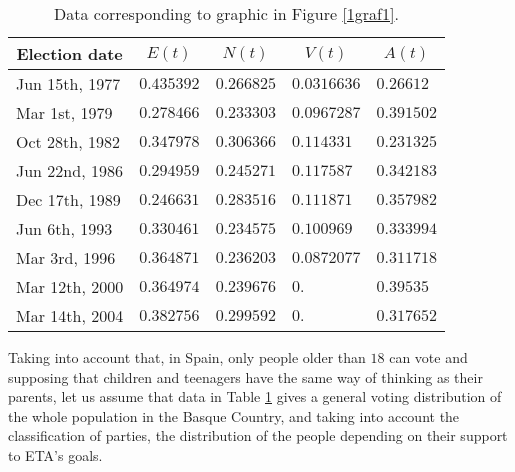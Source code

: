 \begin{table}[htb]
\label{1Table1}
\begin{center}
\begin{tabular}{ccccc}
\hline
Election date & $E(t)$ & $N(t)$ & $V(t)$ & $A(t)$ \\ \hline
\multicolumn{1}{l}{Jun 15th, 1977} & \multicolumn{1}{l}{$0.435392$} & 
\multicolumn{1}{l}{$0.266825$} & \multicolumn{1}{l}{$0.0316636$} & 
\multicolumn{1}{l}{$0.26612$} \\ 
\multicolumn{1}{l}{Mar 1st, 1979} & \multicolumn{1}{l}{$0.278466$} & 
\multicolumn{1}{l}{$0.233303$} & \multicolumn{1}{l}{$0.0967287$} & 
\multicolumn{1}{l}{$0.391502$} \\ 
\multicolumn{1}{l}{Oct 28th, 1982} & \multicolumn{1}{l}{$0.347978$} & 
\multicolumn{1}{l}{$0.306366$} & \multicolumn{1}{l}{$0.114331$} & 
\multicolumn{1}{l}{$0.231325$} \\ 
\multicolumn{1}{l}{Jun 22nd, 1986} & \multicolumn{1}{l}{$0.294959$} & 
\multicolumn{1}{l}{$0.245271$} & \multicolumn{1}{l}{$0.117587$} & 
\multicolumn{1}{l}{$0.342183$} \\ 
\multicolumn{1}{l}{Dec 17th, 1989} & \multicolumn{1}{l}{$0.246631$} & 
\multicolumn{1}{l}{$0.283516$} & \multicolumn{1}{l}{$0.111871$} & 
\multicolumn{1}{l}{$0.357982$} \\ 
\multicolumn{1}{l}{Jun 6th, 1993} & \multicolumn{1}{l}{$0.330461$} & 
\multicolumn{1}{l}{$0.234575$} & \multicolumn{1}{l}{$0.100969$} & 
\multicolumn{1}{l}{$0.333994$} \\ 
\multicolumn{1}{l}{Mar 3rd, 1996} & \multicolumn{1}{l}{$0.364871$} & 
\multicolumn{1}{l}{$0.236203$} & \multicolumn{1}{l}{$0.0872077$} & 
\multicolumn{1}{l}{$0.311718$} \\ 
\multicolumn{1}{l}{Mar 12th, 2000} & \multicolumn{1}{l}{$0.364974$} & 
\multicolumn{1}{l}{$0.239676$} & \multicolumn{1}{l}{$0.$} & 
\multicolumn{1}{l}{$0.39535$} \\ 
\multicolumn{1}{l}{Mar 14th, 2004} & \multicolumn{1}{l}{$0.382756$} & 
\multicolumn{1}{l}{$0.299592$} & \multicolumn{1}{l}{$0.$} & 
\multicolumn{1}{l}{$0.317652$} \\ \hline
\end{tabular}
\end{center}
\caption{Data corresponding to graphic in Figure \ref{1graf1}.}
\end{table}

Taking into account that, in Spain, only people older than $18$ can vote and
supposing that children and teenagers have the same way of thinking as their
parents, let us assume that data in Table \ref{1Table1} gives a general voting distribution 
of the whole population in the Basque Country, and taking into account the classification of parties, 
the distribution of the people depending on their support to ETA's goals.

